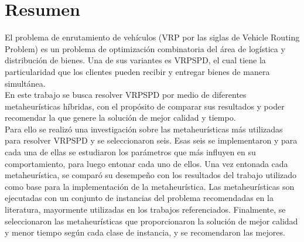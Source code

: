 \setcounter{page}{4}
\chapter*{Resumen}
%

El problema de enrutamiento de vehículos (VRP por las siglas de Vehicle Routing Problem) es un problema de optimización combinatoria del área de logística y distribución de bienes. Una de sus variantes es VRPSPD, el cual tiene la particularidad que los clientes pueden recibir y entregar bienes de manera simultánea.\\

En este trabajo se busca resolver VRPSPD por medio de diferentes metaheurísticas híbridas, con el propósito de comparar sus resultados y poder recomendar la que genere la solución de mejor calidad y tiempo.\\

Para ello se realizó una investigación sobre las metaheurísticas más utilizadas para resolver VRPSPD y se seleccionaron seis. Esas seis se implementaron y para cada una de ellas se estudiaron los parámetros que más influyen en su comportamiento, para luego entonar cada uno de ellos. Una vez entonada cada metaheurística, se comparó su desempeño con los resultados del trabajo utilizado como base para la implementación de la metaheurística. Las metaheurísticas son ejecutadas con un conjunto de instancias del problema recomendadas en la literatura, mayormente utilizadas en los trabajos referenciados. Finalmente, se seleccionaron las metaheurísticas que proporcionaron la solución de mejor calidad y menor tiempo según cada clase de instancia, y se recomendaron las mejores.

\newpage

